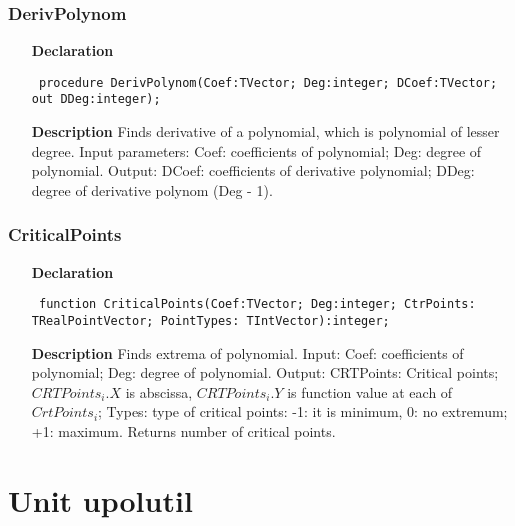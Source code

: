 \documentclass[12pt,a4paper,oneside]{report}
\newcommand{\declarationitem}[1]{\textbf{#1}}
\newcommand{\descriptiontitle}[1]{\textbf{#1}}
\newcommand{\code}[1]{\texttt{#1}}
\begin{document}
\subsubsection{DerivPolynom}
\label{ucrtptpol-DerivPolynom}
\begin{itemize}\item[\declarationitem{Declaration}\hfill]
	\begin{flushleft}
		\code{
			procedure DerivPolynom(Coef:TVector; Deg:integer; DCoef:TVector; out DDeg:integer);}
		
	\end{flushleft}
	
	\par
	\item[\descriptiontitle{Description}]
	Finds derivative of a polynomial, which is polynomial of lesser degree. Input parameters: Coef: coefficients of polynomial; Deg: degree of polynomial. Output: DCoef: coefficients of derivative polynomial; DDeg: degree of derivative polynom (Deg - 1).
	
\end{itemize}
\subsubsection{CriticalPoints}
\label{ucrtptpol-CriticalPoints}
\begin{itemize}\item[\declarationitem{Declaration}\hfill]
	\begin{flushleft}
		\code{
			function CriticalPoints(Coef:TVector; Deg:integer; CtrPoints: TRealPointVector; PointTypes: TIntVector):integer;}
		
	\end{flushleft}
	
	\par
	\item[\descriptiontitle{Description}]
	Finds extrema of polynomial.  Input: Coef: coefficients of polynomial; Deg: degree of polynomial. Output: CRTPoints: Critical points; $CRTPoints_i.X$ is abscissa, $CRTPoints_i.Y$ is function value at each of $CrtPoints_i$; Types: type of critical points: -1: it is minimum, 0: no extremum; +1: maximum. Returns number of critical points.
	
\end{itemize}
\section{Unit upolutil}
\label{upolutil}
\end{document}
